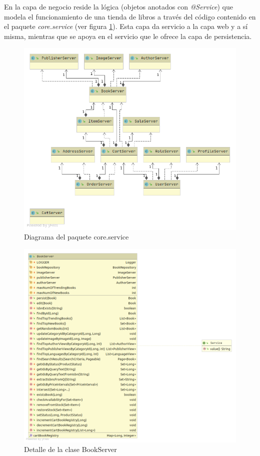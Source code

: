 \documentclass[a4paper]{article}
\begin{document}
   	En la capa de negocio reside la lógica (objetos anotados con \emph{@Service}) que modela el funcionamiento de una tienda de libros a través del código contenido en el paquete \emph{core.service} (ver figura \ref{fig:package_service}). Esta capa da servicio a la capa web y a sí misma, mientras que se apoya en el servicio que le ofrece la capa de persistencia.
    	
   	\begin{figure}[htb!]
		\centering
		\includegraphics[width=\textwidth,keepaspectratio]{package_service}
		\caption{Diagrama del paquete core.service}
		\label{fig:package_service}
	\end{figure}

	\begin{figure}[htb!]
		\centering
		\includegraphics[width=\textwidth,keepaspectratio]{detail_bookServer}
		\caption{Detalle de la clase BookServer}
		\label{fig:detail_bookServer}
	\end{figure}
\end{document}
